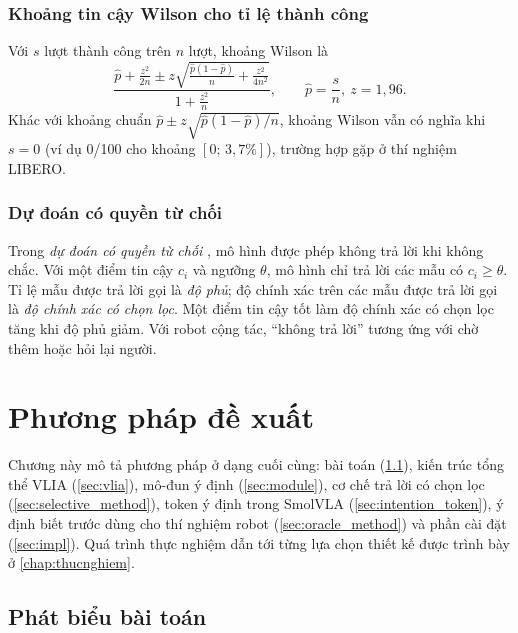 \documentclass[a4paper,oneside]{report}
\begin{document}
\subsection{Khoảng tin cậy Wilson cho tỉ lệ thành công}

Với $s$ lượt thành công trên $n$ lượt, khoảng Wilson \citep{wilson1927probable} là
\begin{equation}
  \frac{\hat{p} + \frac{z^2}{2n} \pm z\sqrt{\frac{\hat{p}(1-\hat{p})}{n} + \frac{z^2}{4n^2}}}{1+\frac{z^2}{n}}, \qquad \hat{p}=\frac{s}{n},\ z=1{,}96.
\end{equation}
Khác với khoảng chuẩn $\hat{p}\pm z\sqrt{\hat{p}(1-\hat{p})/n}$, khoảng Wilson vẫn có nghĩa khi $s=0$ (ví dụ 0/100 cho khoảng $[0;\,3{,}7\%]$), trường hợp gặp ở thí nghiệm LIBERO.

\subsection{Dự đoán có quyền từ chối}

Trong \textit{dự đoán có quyền từ chối} \citep{chow1970optimum,geifman2017selective}, mô hình được phép không trả lời khi không chắc. Với một điểm tin cậy $c_i$ và ngưỡng $\theta$, mô hình chỉ trả lời các mẫu có $c_i\geq\theta$. Tỉ lệ mẫu được trả lời gọi là \textit{độ phủ}; độ chính xác trên các mẫu được trả lời gọi là \textit{độ chính xác có chọn lọc}. Một điểm tin cậy tốt làm độ chính xác có chọn lọc tăng khi độ phủ giảm. Với robot cộng tác, ``không trả lời'' tương ứng với chờ thêm hoặc hỏi lại người.

\chapter{Phương pháp đề xuất}
\label{chap:phuongphap}

Chương này mô tả phương pháp ở dạng cuối cùng: bài toán (\cref{sec:problem}), kiến trúc tổng thể VLIA (\cref{sec:vlia}), mô-đun ý định (\cref{sec:module}), cơ chế trả lời có chọn lọc (\cref{sec:selective_method}), token ý định trong SmolVLA (\cref{sec:intention_token}), ý định biết trước dùng cho thí nghiệm robot (\cref{sec:oracle_method}) và phần cài đặt (\cref{sec:impl}). Quá trình thực nghiệm dẫn tới từng lựa chọn thiết kế được trình bày ở \cref{chap:thucnghiem}.

\section{Phát biểu bài toán}
\label{sec:problem}
\end{document}
